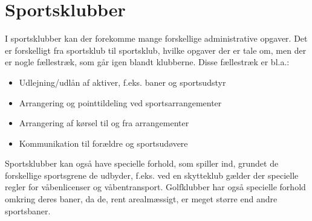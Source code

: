 \section{Sportsklubber} \label{Sportsklubber}

I sportsklubber kan der forekomme mange forskellige administrative opgaver. 
Det er forskelligt fra sportsklub til sportsklub, hvilke opgaver der er tale om, men der er nogle fællestræk, som går igen blandt klubberne. 
Disse fællestræk er bl.a.:
\begin{itemize}
	\item Udlejning/udlån af aktiver, f.eks. baner og sportsudstyr 
	\item Arrangering og pointtildeling ved sportsarrangementer
	\item Arrangering af kørsel til og fra arrangementer
	\item Kommunikation til forældre og sportsudøvere
\end{itemize}

Sportsklubber kan også have specielle forhold, som spiller ind, grundet de forskellige sportsgrene de udbyder, f.eks. ved en skytteklub gælder der specielle regler for våbenlicenser og våbentransport.
Golfklubber har også specielle forhold omkring deres baner, da de, rent arealmæssigt, er meget større end andre sportsbaner. 







